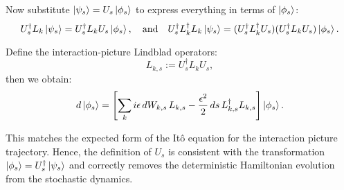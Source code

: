 \documentclass{article}
\begin{document}
Now substitute \( \ket{\psi_s} = U_s \ket{\phi_s} \) to express everything in terms of \( \ket{\phi_s} \):
\[
U_s^\dagger L_k \ket{\psi_s} = U_s^\dagger L_k U_s \ket{\phi_s}, \quad \text{and} \quad U_s^\dagger L_k^\dagger L_k \ket{\psi_s} = (U_s^\dagger L_k^\dagger U_s)(U_s^\dagger L_k U_s) \ket{\phi_s}.
\]

Define the interaction-picture Lindblad operators:
\[
L_{k,s} := U_s^\dagger L_k U_s,
\]
then we obtain:
\begin{equation}
d \ket{\phi_s} = \left[ \sum_k i \epsilon \, dW_{k,s} \, L_{k,s} - \frac{\epsilon^2}{2} \, ds \, L_{k,s}^\dagger L_{k,s} \right] \ket{\phi_s}.
\label{eq:interaction_picture_sde}
\end{equation}

This matches the expected form of the Itô equation for the interaction picture trajectory. Hence, the definition of \( U_s \) is consistent with the transformation \( \ket{\phi_s} = U_s^\dagger \ket{\psi_s} \) and correctly removes the deterministic Hamiltonian evolution from the stochastic dynamics.
\end{document}
